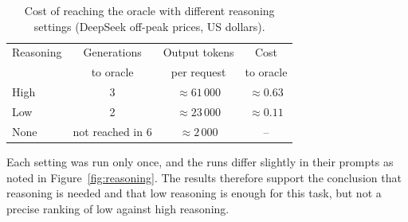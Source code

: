 \begin{table}[tb]
  \centering
  \caption{Cost of reaching the oracle with different reasoning settings
    (DeepSeek off-peak prices, US dollars).}
  \label{tab:reasoning}
  \begin{tabular}{@{}lccc@{}}
    \toprule
    Reasoning & Generations & Output tokens & Cost \\
              & to oracle   & per request   & to oracle \\
    \midrule
    High & 3 & $\approx 61\,000$ & $\approx 0.63$ \\
    Low  & 2 & $\approx 23\,000$ & $\approx 0.11$ \\
    None & not reached in 6 & $\approx 2\,000$ & -- \\
    \bottomrule
  \end{tabular}
\end{table}

Each setting was run only once, and the runs differ slightly in their
prompts as noted in Figure~\ref{fig:reasoning}. The results therefore support
the conclusion that reasoning is needed and that low reasoning is enough for
this task, but not a precise ranking of low against high reasoning.
